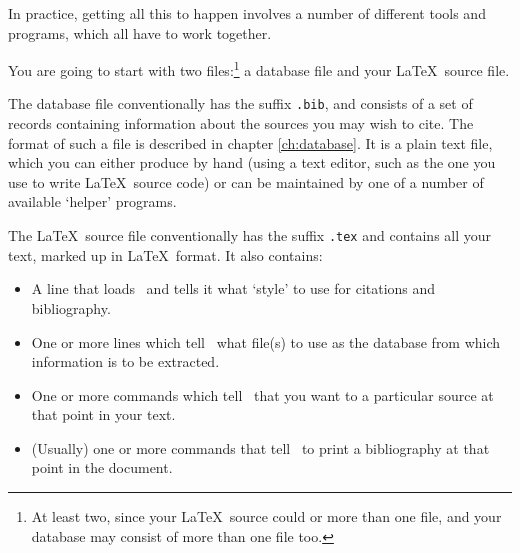 In practice, getting all this to happen involves a number of different
tools and programs, which all have to work together.

You are going to start with two files:\footnote{At least two, since
  your \LaTeX\ source could  or  more than one
  file, and your database may consist of more than one file too.} a
database file and your \LaTeX\ source file.

The database file conventionally has the suffix \texttt{.bib}, and
consists of a set of records containing information about the sources
you may wish to cite. The format of such a file is described in
chapter \ref{ch:database}. It is a plain text file, which you can
either produce by hand (using a text editor, such as the one you use
to write \LaTeX\ source code) or can be maintained by one of a number
of available `helper' programs.

The \LaTeX\ source file conventionally has the suffix \texttt{.tex}
and contains all your text, marked up in \LaTeX\ format. It also
contains:
\begin{itemize}
\item A line that
  loads \biblatex\ and tells it what `style' to use for citations and
  bibliography.
\item One or more lines
  which tell \biblatex\ what file(s) to use as the database from which
  information is to be extracted.
\item One or more commands which tell
  \biblatex\ that you want to  a particular source at that
  point in your text.
\item (Usually) one or more
  commands that tell \biblatex\ to print a bibliography at that point
  in the document.
\end{itemize}

